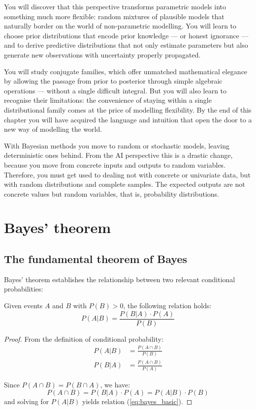 You will discover that this perspective transforms parametric models into something much more flexible: random mixtures of plausible models that naturally border on the world of non-parametric modelling. You will learn to choose prior distributions that encode prior knowledge — or honest ignorance — and to derive predictive distributions that not only estimate parameters but also generate new observations with uncertainty properly propagated.

You will study conjugate families, which offer unmatched mathematical elegance by allowing the passage from prior to posterior through simple algebraic operations — without a single difficult integral. But you will also learn to recognise their limitations: the convenience of staying within a single distributional family comes at the price of modelling flexibility. By the end of this chapter you will have acquired the language and intuition that open the door to a new way of modelling the world.

With Bayesian methods you move to random or stochastic models, leaving deterministic ones behind. From the AI perspective this is a drastic change, because you move from concrete inputs and outputs to random variables. Therefore, you must get used to dealing not with concrete or univariate data, but with random distributions and complete samples. The expected outputs are not concrete values but random variables, that is, probability distributions.

\section{Bayes' theorem}

\subsection{The fundamental theorem of Bayes}

Bayes' theorem establishes the relationship between two relevant conditional probabilities:
\begin{theorem}
Given events $A$ and $B$ with $P(B) > 0$, the following relation holds:
\begin{equation}\label{eq:bayes_basic}
\boxed{P(A|B) = \frac{P(B|A) \cdot P(A)}{P(B)}}
\end{equation}
\end{theorem}

\begin{proof}
From the definition of conditional probability:
\begin{align*}
P(A|B) &= \frac{P(A \cap B)}{P(B)} \\
P(B|A) &= \frac{P(A \cap B)}{P(A)}
\end{align*}

Since $P(A \cap B) = P(B \cap A)$, we have:
$$P(A \cap B) = P(B|A) \cdot P(A) = P(A|B) \cdot P(B)$$
and solving for $P(A|B)$ yields relation (\ref{eq:bayes_basic}).
\end{proof}

